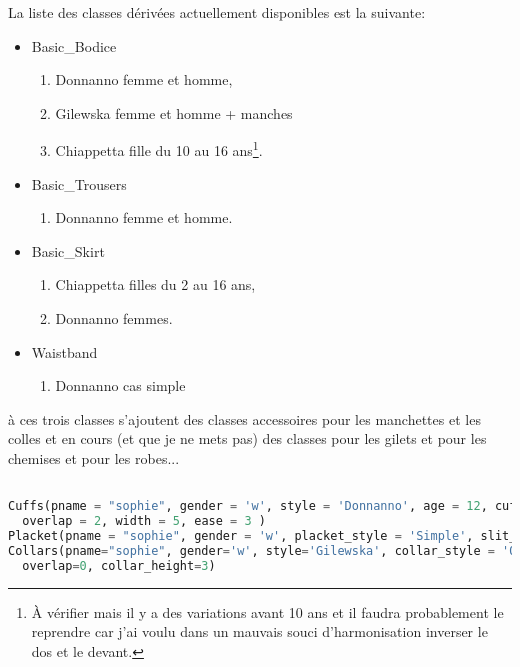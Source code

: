 \documentclass[10pt,a4paper,twoside]{report}
\begin{document}
La liste des classes dérivées actuellement disponibles est la suivante:
\begin{itemize}
  \item Basic\_Bodice
  \begin{enumerate}
    \item Donnanno femme et homme,
    \item Gilewska femme et homme + manches
    \item Chiappetta fille du 10 au 16 ans\footnote{À vérifier mais il y a des variations avant 10 ans et il faudra probablement le reprendre car j'ai voulu dans un mauvais souci d'harmonisation inverser le dos et le devant.}.
  \end{enumerate}
  \item Basic\_Trousers
  \begin{enumerate}
  \item Donnanno femme et homme.
  \end{enumerate}
  \item Basic\_Skirt
  \begin{enumerate}
    \item Chiappetta filles du 2 au 16 ans,
    \item Donnanno femmes.
  \end{enumerate}
  \item Waistband
  \begin{enumerate}
  \item Donnanno cas simple
  \end{enumerate}
\end{itemize}


à ces trois classes s'ajoutent des classes accessoires pour les manchettes et les colles
et en cours (et que je ne mets pas) des classes pour les gilets et pour les chemises et pour les robes...

\begin{lstlisting}[language=python]

Cuffs(pname = "sophie", gender = 'w', style = 'Donnanno', age = 12, cuff_style = 'Simple',\
  overlap = 2, width = 5, ease = 3 )
Placket(pname = "sophie", gender = 'w', placket_style = 'Simple', slit_length = 10)
Collars(pname="sophie", gender='w', style='Gilewska', collar_style = 'Officer',\
  overlap=0, collar_height=3)

\end{lstlisting}
\end{document}
